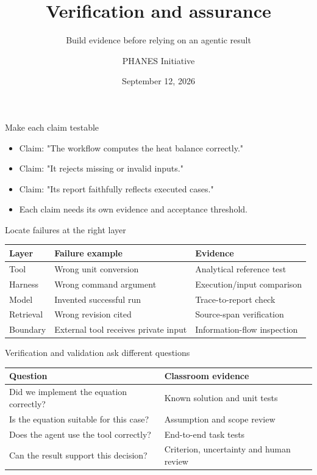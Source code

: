 \documentclass[aspectratio=169,11pt]{beamer}
\title{Verification and assurance}
\subtitle{Build evidence before relying on an agentic result}
\author{PHANES Initiative}
\institute{The University of Texas at Austin}
\date{September 12, 2026}
\begin{document}
\begin{frame}[plain]
\titlepage
\end{frame}
\begin{frame}[t,fragile]{Make each claim testable}
\fontsize{11.5}{14}\selectfont
\begin{itemize}\setlength{\itemsep}{2mm}
\item Claim: "The workflow computes the heat balance correctly."
\item Claim: "It rejects missing or invalid inputs."
\item Claim: "Its report faithfully reflects executed cases."
\item Each claim needs its own evidence and acceptance threshold.
\end{itemize}
\end{frame}
\begin{frame}[t,fragile]{Locate failures at the right layer}
\fontsize{10.5}{12.5}\selectfont\setlength{\tabcolsep}{4pt}\renewcommand{\arraystretch}{1.15}
\begin{tabular}{>{\raggedright\arraybackslash}p{}>{\raggedright\arraybackslash}p{}>{\raggedright\arraybackslash}p{}}
\toprule
\textbf{Layer} & \textbf{Failure example} & \textbf{Evidence} \\ \midrule
Tool & Wrong unit conversion & Analytical reference test \\[2pt]
Harness & Wrong command argument & Execution/input comparison \\[2pt]
Model & Invented successful run & Trace-to-report check \\[2pt]
Retrieval & Wrong revision cited & Source-span verification \\[2pt]
Boundary & External tool receives private input & Information-flow inspection \\[2pt]
\bottomrule\end{tabular}\par\vspace{2mm}
\end{frame}
\begin{frame}[t,fragile]{Verification and validation ask different questions}
\fontsize{10.5}{12.5}\selectfont\setlength{\tabcolsep}{4pt}\renewcommand{\arraystretch}{1.15}
\begin{tabular}{>{\raggedright\arraybackslash}p{}>{\raggedright\arraybackslash}p{}}
\toprule
\textbf{Question} & \textbf{Classroom evidence} \\ \midrule
Did we implement the equation correctly? & Known solution and unit tests \\[2pt]
Is the equation suitable for this case? & Assumption and scope review \\[2pt]
Does the agent use the tool correctly? & End-to-end task tests \\[2pt]
Can the result support this decision? & Criterion, uncertainty and human review \\[2pt]
\bottomrule\end{tabular}\par\vspace{2mm}
\end{frame}
\end{document}
